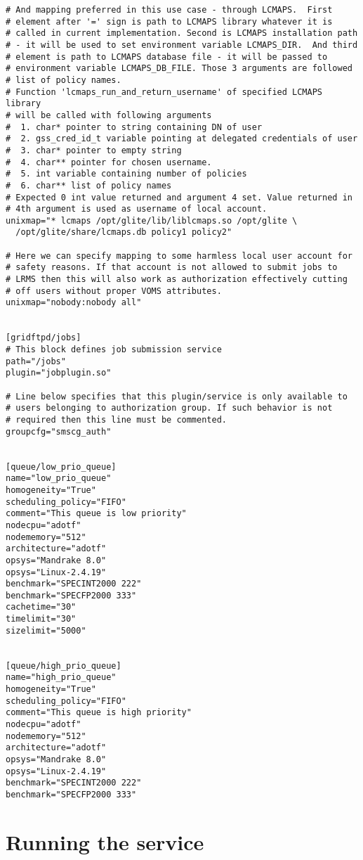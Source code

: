 \documentclass{article}
\begin{document}
\begin{verbatim}
# And mapping preferred in this use case - through LCMAPS.  First
# element after '=' sign is path to LCMAPS library whatever it is
# called in current implementation. Second is LCMAPS installation path
# - it will be used to set environment variable LCMAPS_DIR.  And third
# element is path to LCMAPS database file - it will be passed to
# environment variable LCMAPS_DB_FILE. Those 3 arguments are followed
# list of policy names.
# Function 'lcmaps_run_and_return_username' of specified LCMAPS library
# will be called with following arguments
#  1. char* pointer to string containing DN of user
#  2. gss_cred_id_t variable pointing at delegated credentials of user
#  3. char* pointer to empty string
#  4. char** pointer for chosen username.
#  5. int variable containing number of policies
#  6. char** list of policy names
# Expected 0 int value returned and argument 4 set. Value returned in
# 4th argument is used as username of local account.
unixmap="* lcmaps /opt/glite/lib/liblcmaps.so /opt/glite \
  /opt/glite/share/lcmaps.db policy1 policy2"

# Here we can specify mapping to some harmless local user account for
# safety reasons. If that account is not allowed to submit jobs to
# LRMS then this will also work as authorization effectively cutting
# off users without proper VOMS attributes.
unixmap="nobody:nobody all"


[gridftpd/jobs]
# This block defines job submission service
path="/jobs"
plugin="jobplugin.so"

# Line below specifies that this plugin/service is only available to
# users belonging to authorization group. If such behavior is not
# required then this line must be commented.
groupcfg="smscg_auth"


[queue/low_prio_queue]
name="low_prio_queue"
homogeneity="True"
scheduling_policy="FIFO"
comment="This queue is low priority"
nodecpu="adotf"
nodememory="512"
architecture="adotf"
opsys="Mandrake 8.0"
opsys="Linux-2.4.19"
benchmark="SPECINT2000 222"
benchmark="SPECFP2000 333"
cachetime="30"
timelimit="30"
sizelimit="5000"


[queue/high_prio_queue]
name="high_prio_queue"
homogeneity="True"
scheduling_policy="FIFO"
comment="This queue is high priority"
nodecpu="adotf"
nodememory="512"
architecture="adotf"
opsys="Mandrake 8.0"
opsys="Linux-2.4.19"
benchmark="SPECINT2000 222"
benchmark="SPECFP2000 333"
\end{verbatim}


\section{Running the service}
\end{document}
